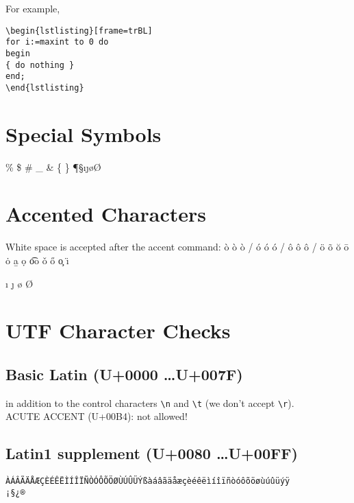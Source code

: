 \documentclass[a4paper]{article}
\begin{document}
For example,
\begin{verbatim}
\begin{lstlisting}[frame=trBL]
for i:=maxint to 0 do
begin
{ do nothing }
end;
\end{lstlisting}
\end{verbatim}



\section{Special Symbols}

\% \$ \# \_ \& \{ \} \P \S \i \j \o \O

\section{Accented Characters}

White space is accepted after the accent command:\newline
\`o \` o \`{o} / 
\'o \' o \'{o} /
\^o \^ o \^{o} /
\"o
\~o
\u o
\=o
\.o
\b{a}
\d o
\t oo
\v o
\H o
\c o
\"{\i}

\noindent
\i 
\j
\o
\O



\section{UTF Character Checks}

\subsection{Basic Latin (U+0000 \ldots U+007F)}
\begin{verbatim*}
 !\"#$%&'()*+,-./0123456789:;<=>?@ABCDEFGHIJKLMNOPQRSTUVWXYZ
[\]^_`abcdefghijklmnopqrstuvwxyz{|}~
\end{verbatim*}
in addition to the control characters
\verb!\n! and \verb!\t!  (we don't accept \verb!\r!).\\
ACUTE ACCENT (U+00B4): not allowed!



\subsection{Latin1 supplement (U+0080 \ldots U+00FF)}
\begin{verbatim}
ÀÁÂÃÄÅÆÇÈÉÊËÌÍÎÏÑÒÓÔÕÖØÙÚÛÜÝßàáâãäåæçèéêëìíîïñòóôõöøùúûüýÿ
¡§¿®
\end{verbatim}
\end{document}
